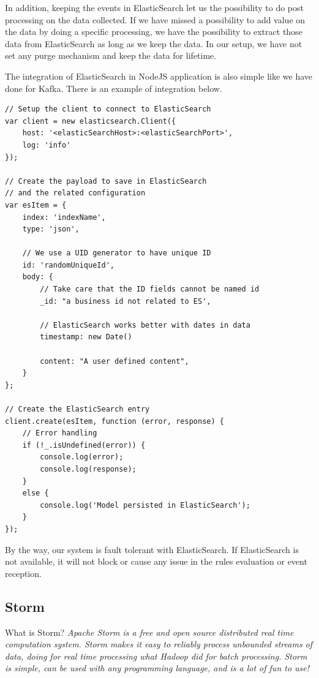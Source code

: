 In addition, keeping the events in ElasticSearch let us the possibility to do post processing on the data collected. If we have missed a possibility to add value on the data by doing a specific processing, we have the possibility to extract those data from ElasticSearch as long as we keep the data. In our setup, we have not set any purge mechanism and keep the data for lifetime.

The integration of ElasticSearch in NodeJS application is also simple like we have done for Kafka. There is an example of integration below.

\begin{lstlisting}
// Setup the client to connect to ElasticSearch
var client = new elasticsearch.Client({
	host: '<elasticSearchHost>:<elasticSearchPort>',
	log: 'info'
});

// Create the payload to save in ElasticSearch 
// and the related configuration
var esItem = {
	index: 'indexName',
	type: 'json',

	// We use a UID generator to have unique ID
	id: 'randomUniqueId', 
	body: {
		// Take care that the ID fields cannot be named id
		_id: "a business id not related to ES', 

		// ElasticSearch works better with dates in data
		timestamp: new Date() 

		content: "A user defined content",
	}
};

// Create the ElasticSearch entry
client.create(esItem, function (error, response) {
	// Error handling
	if (!_.isUndefined(error)) {
		console.log(error);
		console.log(response);
	}
	else {
		console.log('Model persisted in ElasticSearch');
	}
});
\end{lstlisting}

By the way, our system is fault tolerant with ElasticSearch. If ElasticSearch is not available, it will not block or cause any issue in the rules evaluation or event reception. 

\subsection{Storm}

What is Storm? \emph{Apache Storm is a free and open source distributed real time computation system. Storm makes it easy to reliably process unbounded streams of data, doing for real time processing what Hadoop did for batch processing. Storm is simple, can be used with any programming language, and is a lot of fun to use!}

